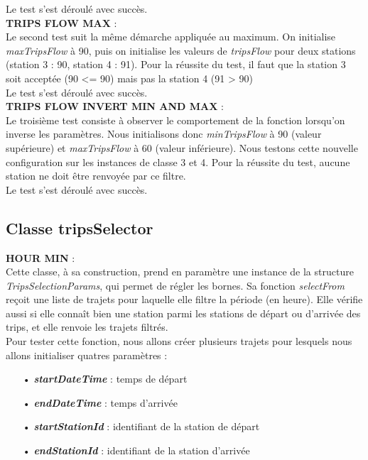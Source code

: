 \documentclass[12pt]{article}
\begin{document}
		Le test s’est déroulé avec succès.\\


		\textbf{TRIPS FLOW MAX} :\\
		Le second test suit la même démarche appliquée au maximum. On initialise \textit{maxTripsFlow} à 90, puis on initialise les valeurs de \textit{tripsFlow} pour deux stations (station 3 : 90, station 4 : 91). Pour la réussite du test, il faut que la station 3 soit acceptée (90 <= 90) mais pas la station 4 (91 > 90)\\

		Le test s’est déroulé avec succès.\\


		\textbf{TRIPS FLOW INVERT MIN AND MAX} :\\
		Le troisième test consiste à observer le comportement de la fonction lorsqu’on inverse les paramètres. Nous initialisons donc \textit{minTripsFlow} à 90 (valeur supérieure) et \textit{maxTripsFlow} à 60 (valeur inférieure). Nous testons cette nouvelle configuration sur les instances de classe 3 et 4. Pour la réussite du test, aucune station ne doit être renvoyée par ce filtre.\\
	
	Le test s’est déroulé avec succès.
	
	\subsection{Classe tripsSelector}
	\textbf{HOUR MIN} :\\
	Cette classe, à sa construction, prend en paramètre une instance de la structure \textit{TripsSelectionParams}, qui permet de régler les bornes. Sa fonction \textit{selectFrom} reçoit une liste de trajets pour laquelle elle filtre la période (en heure). Elle vérifie aussi si elle connaît bien une station parmi les stations de départ ou d’arrivée des trips, et elle renvoie les trajets filtrés.\\
Pour tester cette fonction, nous allons créer plusieurs trajets pour lesquels nous allons initialiser quatres paramètres :\\
	\begin{itemize}
	\item[•] \textbf{\textit{startDateTime}} : temps de départ
	\item[•] \textbf{\textit{endDateTime}} :  temps d’arrivée 
	\item[•] \textbf{\textit{startStationId}} : identifiant de la station de départ
	\item[•] \textbf{\textit{endStationId}} : identifiant de la station d’arrivée\\
	\end{itemize}
	
\end{document}
